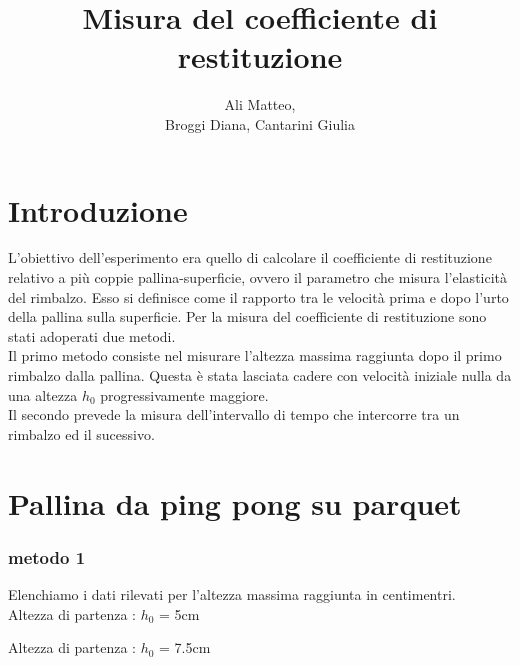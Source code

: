 \documentclass[a4paper]{article}
\title{Misura del coefficiente di restituzione}
\author{Ali Matteo,\\Broggi Diana, Cantarini Giulia}
\date{ }
\theoremstyle{definition}
\begin{document}
	\maketitle
	\section*{Introduzione}
	L'obiettivo dell'esperimento era quello di calcolare il coefficiente di restituzione relativo a più coppie pallina-superficie, ovvero il parametro che misura l'elasticità del rimbalzo. Esso si definisce come il rapporto tra le velocità prima e dopo l'urto della pallina sulla superficie.
	Per la misura del coefficiente di restituzione sono stati adoperati due metodi.\\
	Il primo metodo consiste nel misurare l'altezza massima raggiunta dopo il primo rimbalzo dalla pallina. Questa è stata lasciata cadere con velocità iniziale nulla da una altezza \(h_{0}\) progressivamente maggiore.\\
	Il secondo prevede la misura dell'intervallo di tempo che intercorre tra un rimbalzo ed il sucessivo.
	\section*{Pallina da ping pong su parquet}
	\subsubsection*{metodo 1}
	Elenchiamo i dati rilevati per l'altezza massima raggiunta in centimentri.\\
	Altezza di partenza : \(h_{0}\) = 5cm
	\begin{figure}[!htbp]
	\end{figure}
	
	\noindent Altezza di partenza : \(h_{0}\) = 7.5cm
	\begin{figure}[!htbp]
	\end{figure}
	
\end{document}
